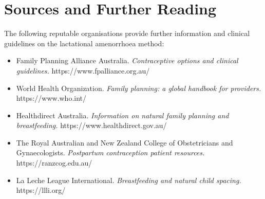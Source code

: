 \section*{Sources and Further Reading}
The following reputable organisations provide further information and clinical guidelines on the lactational amenorrhoea method:
\begin{itemize}
    \item Family Planning Alliance Australia. \textit{Contraceptive options and clinical guidelines.} https://www.fpalliance.org.au/
    \item World Health Organization. \textit{Family planning: a global handbook for providers.} https://www.who.int/
    \item Healthdirect Australia. \textit{Information on natural family planning and breastfeeding.} https://www.healthdirect.gov.au/
    \item The Royal Australian and New Zealand College of Obstetricians and Gynaecologists. \textit{Postpartum contraception patient resources.} https://ranzcog.edu.au/
    \item La Leche League International. \textit{Breastfeeding and natural child spacing.} https://llli.org/
\end{itemize}
